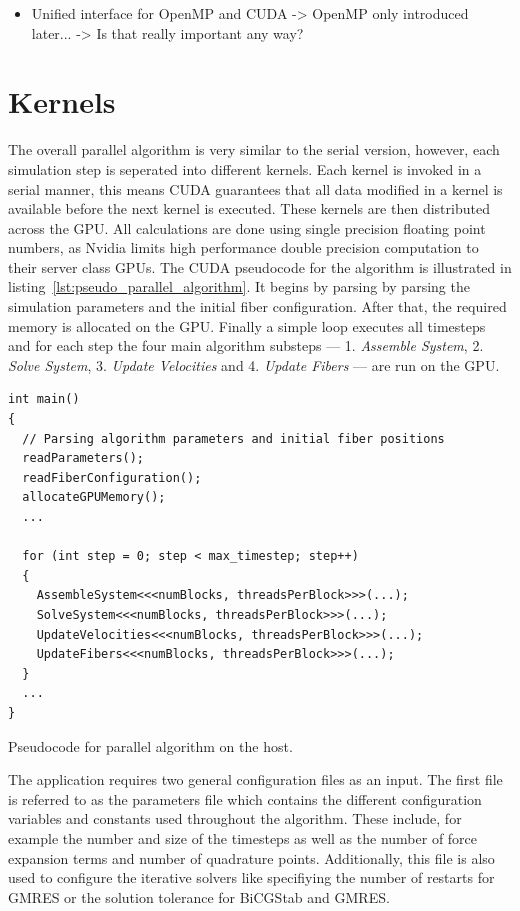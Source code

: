\documentclass[a4paper,11pt]{kth-mag}
\begin{document}
\begin{itemize}
\item Unified interface for OpenMP and CUDA -> OpenMP only introduced later... -> Is that really important any way?
\end{itemize}

\section{Kernels}
The overall parallel algorithm is very similar to the serial version, however, each simulation step is seperated into different kernels. Each kernel is invoked in a serial manner, this means CUDA guarantees that all data modified in a kernel is available before the next kernel is executed. These kernels are then distributed across the GPU. All calculations are done using single precision floating point numbers, as Nvidia limits high performance double precision computation to their server class GPUs. The CUDA pseudocode for the algorithm is illustrated in listing~\ref{lst:pseudo_parallel_algorithm}. It begins by parsing by parsing the simulation parameters and the initial fiber configuration. After that, the required memory is allocated on the GPU. Finally a simple loop executes all timesteps and for each step the four main algorithm substeps — 1. \emph{Assemble System}, 2. \emph{Solve System}, 3. \emph{Update Velocities} and 4. \emph{Update Fibers} — are run on the GPU.

\begin{listing}[!htbp]
  \centering
  \begin{verbatim}
int main()
{
  // Parsing algorithm parameters and initial fiber positions
  readParameters();
  readFiberConfiguration();
  allocateGPUMemory();
  ...

  for (int step = 0; step < max_timestep; step++)
  {
    AssembleSystem<<<numBlocks, threadsPerBlock>>>(...);
    SolveSystem<<<numBlocks, threadsPerBlock>>>(...);
    UpdateVelocities<<<numBlocks, threadsPerBlock>>>(...);
    UpdateFibers<<<numBlocks, threadsPerBlock>>>(...);
  }
  ...
}
  \end{verbatim}
  \caption{Pseudocode for parallel algorithm on the host.}
  \label{lst:pseudo_parallel_algorithm}
\end{listing}

The application requires two general configuration files as an input. The first file is referred to as the parameters file which contains the different configuration variables and constants used throughout the algorithm. These include, for example the number and size of the timesteps as well as the number of force expansion terms and number of quadrature points. Additionally, this file is also used to configure the iterative solvers like specifiying the number of restarts for GMRES or the solution tolerance for BiCGStab and GMRES.
\end{document}
